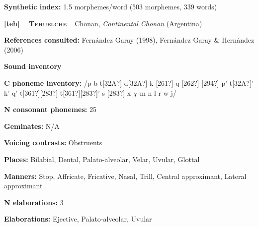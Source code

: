 \begin{styleBody}
\textbf{Synthetic index: }1.5 morphemes/word (503 morphemes, 339 words)
\end{styleBody}

\clearpage\begin{styleBody}
\textbf{[teh] }\ \ \textbf{\textsc{Tehuelche}}\textbf{\ \ }Chonan, \textit{Continental Chonan} (Argentina)
\end{styleBody}

\begin{styleBody}
\textbf{References consulted: }Fernández Garay (1998), Fernández Garay \& Hernández (2006)
\end{styleBody}

\begin{styleBody}
\textbf{Sound inventory}
\end{styleBody}

\begin{styleBody}
\textbf{C phoneme inventory:} /p b t[32A?] d[32A?] k [261?] q [262?] [294?] p’ t[32A?]’ k’ q’ t[361?][283?] t[361?][283?]’ s [283?] x $\chi $ m n l r w j/
\end{styleBody}

\begin{styleBody}
\textbf{N consonant phonemes:} 25
\end{styleBody}

\begin{styleBody}
\textbf{Geminates:} N/A
\end{styleBody}

\begin{styleBody}
\textbf{Voicing contrasts:} Obstruents
\end{styleBody}

\begin{styleBody}
\textbf{Places:} Bilabial, Dental, Palato-alveolar, Velar, Uvular, Glottal
\end{styleBody}

\begin{styleBody}
\textbf{Manners:} Stop, Affricate, Fricative, Nasal, Trill, Central approximant, Lateral approximant
\end{styleBody}

\begin{styleBody}
\textbf{N elaborations:} 3
\end{styleBody}

\begin{styleBody}
\textbf{Elaborations:} Ejective, Palato-alveolar, Uvular
\end{styleBody}

